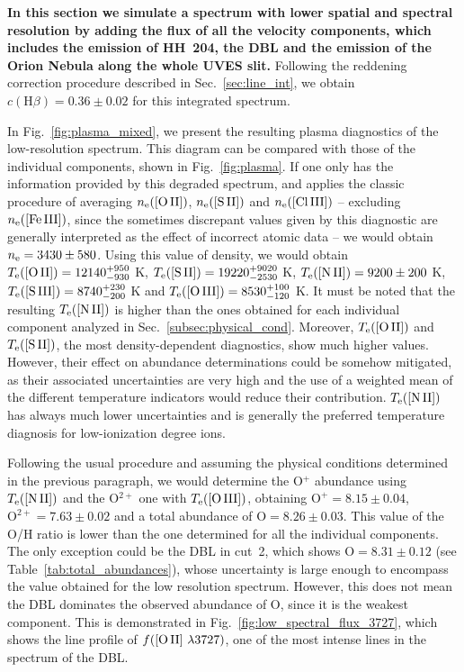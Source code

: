 \documentclass[twocolumn,linenumbers]{aastex63}
\begin{document}
{\bf In this section we simulate a spectrum with lower spatial and spectral resolution by adding the flux of all the velocity components, which includes the emission of HH~204, the DBL and the emission of the Orion Nebula along the whole UVES slit.} Following the reddening correction procedure described in Sec.~\ref{sec:line_int}, we obtain $c(\text{H}\beta)=0.36\pm 0.02$ for this integrated spectrum.

In Fig.~\ref{fig:plasma_mixed}, we present the resulting plasma diagnostics of the low-resolution spectrum. This diagram can be compared with those of the individual components, shown in Fig.~\ref{fig:plasma}. If one only has the information provided by this degraded spectrum, and applies the classic procedure of averaging $n_{\rm e}(\text{[O\thinspace II]})$,  $n_{\rm e}(\text{[S\thinspace II]})$ and  $n_{\rm e}(\text{[Cl\thinspace III]})$ -- excluding $n_{\rm e}(\text{[Fe\thinspace III]})$, since the sometimes discrepant values given by this diagnostic are generally interpreted as the effect of incorrect atomic data --  we would obtain $n_{\rm e}= 3430 \pm 580 $. Using this value of density, we would obtain  $T_{\rm e}(\text{[O\thinspace II]})=12140^{+950} _{-930}$ K, $T_{\rm e}(\text{[S\thinspace II]})=19220^{+9020} _{-2530}$ K, $T_{\rm e}(\text{[N\thinspace II]})=9200\pm 200$ K, $T_{\rm e}(\text{[S\thinspace III]})=8740^{+230} _{-200}$ K and $T_{\rm e}(\text{[O\thinspace III]})=8530^{+100} _{-120}$ K. It must be noted that the resulting $T_{\rm e}(\text{[N\thinspace II]})$ is higher than the ones obtained for each individual component analyzed in Sec.~\ref{subsec:physical_cond}. Moreover, $T_{\rm e}(\text{[O\thinspace II]})$ and $T_{\rm e}(\text{[S\thinspace II]})$, the most density-dependent diagnostics, show much higher values. However, their effect on abundance determinations could be somehow mitigated, as their associated uncertainties are very high and the use of a weighted mean of the different temperature indicators would reduce their contribution. $T_{\rm e}(\text{[N\thinspace II]})$ has always much lower uncertainties and is generally the preferred temperature diagnosis for low-ionization degree ions.

Following the usual procedure and assuming the physical conditions determined in the previous paragraph, we would determine the O$^{+}$ abundance using $T_{\rm e}(\text{[N\thinspace II]})$ and the O$^{2+}$ one with  $T_{\rm e}(\text{[O\thinspace III]})$, obtaining $\text{O}^{+}=8.15\pm 0.04$, $\text{O}^{2+}=7.63 \pm 0.02$ and a total abundance of $\text{O}=8.26 \pm 0.03$. This value of the O/H ratio is lower than the one determined for all the individual components. The only exception could be the DBL in cut~2, which shows $\text{O}=8.31 \pm 0.12$ (see Table~\ref{tab:total_abundances}), whose uncertainty is large enough to encompass the value obtained for the low resolution spectrum. However, this does not mean the DBL dominates the observed abundance of O, since it is the weakest component. This is demonstrated in Fig.~\ref{fig:low_spectral_flux_3727}, which shows the line profile of $f(\text{[O\thinspace II] } \lambda 3727)$, one of the most intense lines in the spectrum of the DBL.
\end{document}
